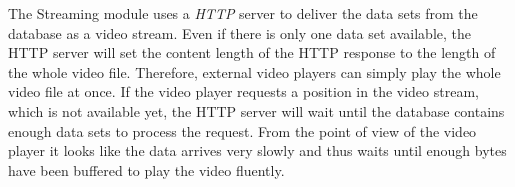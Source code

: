 The Streaming module uses a \emph{HTTP} server to deliver the data sets from the database as a video stream. Even if there is only one data set available, the HTTP server will set the content length of the HTTP response to the length of the whole video file. Therefore, external video players can simply play the whole video file at once. If the video player requests a position in the video stream, which is not available yet, the HTTP server will wait until the database contains enough data sets to process the request. From the point of view of the video player it looks like the data arrives very slowly and thus waits until enough bytes have been buffered to play the video fluently.
